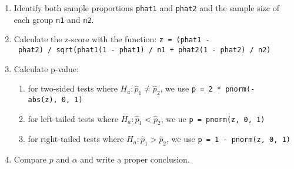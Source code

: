 \begin{enumerate}
\def\labelenumi{\arabic{enumi}.}
\item
  Identify both sample proportions \texttt{phat1} and \texttt{phat2} and
  the sample size of each group \texttt{n1} and \texttt{n2}.
\item
  Calculate the z-score with the function:
  \texttt{z\ =\ (phat1\ -\ phat2)\ /\ sqrt(phat1(1\ -\ phat1)\ /\ n1\ +\ phat2(1\ -\ phat2)\ /\ n2)}
\item
  Calculate p-value:

  \begin{enumerate}
  \def\labelenumii{\alph{enumii}.}
  \item
    for two-sided tests where \(H_a: \hat{p}_1 \neq \hat{p}_2\), we use
    \texttt{p\ =\ 2\ *\ pnorm(-abs(z),\ 0,\ 1)}
  \item
    for left-tailed tests where \(H_a: \hat{p}_1 < \hat{p}_2\), we ue
    \texttt{p\ =\ pnorm(z,\ 0,\ 1)}
  \item
    for right-tailed tests where \(H_a: \hat{p}_1 > \hat{p}_2\), we use
    \texttt{p\ =\ 1\ -\ pnorm(z,\ 0,\ 1)}
  \end{enumerate}
\item
  Compare \(p\) and \(\alpha\) and write a proper conclusion.
\end{enumerate}

